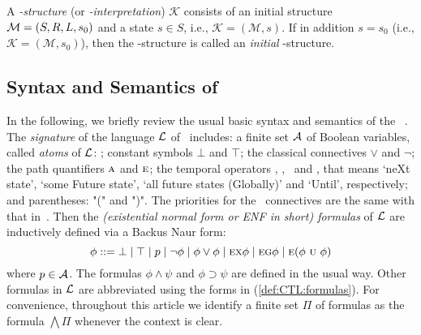 \documentclass[letterpaper]{article} %
\begin{document}

A {\em \MPK-structure} (or {\em \MPK-interpretation}) $\mathcal{K}$ consists of an initial structure 
${\cal M}=(S, R, L, s_0)$ and a state $s\in S$, i.e.,  $\mathcal{K} = (\mathcal{M}, s)$. 
If in addition $s=s_0$ (i.e., $\mathcal{K} = (\mathcal{M}, s_0)$), then the \MPK-structure is called an {\em initial} \MPK-structure.



\subsection{Syntax and Semantics of \CTL}
In the following, we briefly review the usual basic syntax and semantics
of the \CTL~\cite{DBLP:journals/toplas/ClarkeES86}.
The {\em signature} of the language $\cal L$ of \CTL\ includes:
  a finite set $\cal A$ of Boolean variables, called {\em atoms} of $\cal L$: ;
   constant symbols $\bot$ and $\top$;
  the classical connectives $\lor$ and $\neg$;
 the path quantifiers $\textsc{a}$ and $\textsc{e}$;
  the temporal operators \NEXT, \FUTURE, \GLOBAL\ and \UNTIL, that
  means `neXt state', `some Future state', `all future states (Globally)' and `Until', respectively;
 and parentheses: "(" and ")".
The priorities for the \CTL\ connectives are the same with that in~\cite{renyansfirstpaper}.
Then the {\em (existential normal form or ENF in short) formulas} of
$\cal L$ are inductively defined via a Backus Naur form:
\begin{equation}\label{def:CTL:formulas}
  \phi ::=  \bot \mid \top \mid p \mid\neg\phi \mid \phi\lor\phi \mid
    \EXIST \NEXT \phi \mid
    \EXIST \GLOBAL \phi \mid
    \EXIST (\phi\ \UNTIL\ \phi)%
\end{equation}
where $p\in\cal A$. The formulas $\phi\land\psi$ and $\phi\supset \psi$
are defined in the usual way.
Other formulas in $\cal L$ are abbreviated
using the forms in (\ref{def:CTL:formulas}).
For convenience, throughout this article we identify a finite set $\Pi$ of formulas as the formula $\bigwedge\Pi$ whenever the context is clear.
\end{document}
